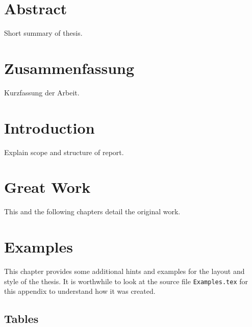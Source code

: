 \documentclass[11pt,a4paper]{book}
\begin{document}
\frontmatter


\chapter*{Abstract}
Short summary of thesis.

\chapter*{Zusammenfassung}
Kurzfassung der Arbeit.

\tableofcontents

\mainmatter
\chapter{Introduction}
\label{s:Introduction}
Explain scope and structure of report.

\chapter{Great Work}
\label{s:GreatWork}

This and the following chapters detail the original work.

\chapter{Examples}
\label{s:Examples}

This chapter provides some additional hints and examples for the
layout and style of the thesis. It is worthwhile to look at the source
file \verb|Examples.tex| for this appendix to understand how it was
created.

\section{Tables}
\end{document}
